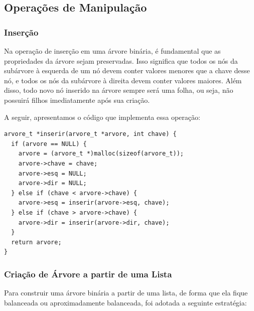 \vspace{3mm}

\subsection{Operações de Manipulação}

\subsubsection{Inserção}

Na operação de inserção em uma árvore binária, é fundamental que as propriedades da árvore sejam preservadas. Isso significa que todos os nós da subárvore à esquerda de um nó devem conter valores menores que a chave desse nó, e todos os nós da subárvore à direita devem conter valores maiores. Além disso, todo novo nó inserido na árvore sempre será uma folha, ou seja, não possuirá filhos imediatamente após sua criação.

A seguir, apresentamos o código que implementa essa operação:

\vspace{3mm}

\begin{lstlisting}
arvore_t *inserir(arvore_t *arvore, int chave) {
  if (arvore == NULL) {
    arvore = (arvore_t *)malloc(sizeof(arvore_t));
    arvore->chave = chave;
    arvore->esq = NULL;
    arvore->dir = NULL;
  } else if (chave < arvore->chave) {
    arvore->esq = inserir(arvore->esq, chave);
  } else if (chave > arvore->chave) {
    arvore->dir = inserir(arvore->dir, chave);
  }
  return arvore;
}
\end{lstlisting}

\subsubsection{Criação de Árvore a partir de uma Lista}

Para construir uma árvore binária a partir de uma lista, de forma que ela fique balanceada ou aproximadamente balanceada, foi adotada a seguinte estratégia:


